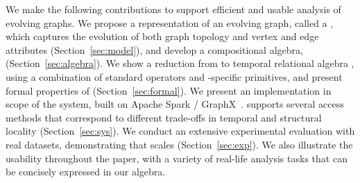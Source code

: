 We make the following contributions to support efficient and usable
analysis of evolving graphs.
%
%
 We propose a representation of an evolving graph, called a \tg, which
 captures the evolution of both graph topology and vertex and edge
 attributes (Section~\ref{sec:model}), and develop a compositional \tg
 algebra, \tga (Section~\ref{sec:algebra}).
%
We show a reduction from \tga to temporal relational algebra
  \tra, using a combination of standard operators and \tg-specific
  primitives, and present formal properties of \tga
  (Section~\ref{sec:formal}).
%
We present an implementation in scope of the \ql system, built
  on Apache Spark / GraphX~\cite{DBLP:conf/osdi/GonzalezXDCFS14}. \ql
  supports several access methods that correspond to different
  trade-offs in temporal and structural locality
  (Section~\ref{sec:sys}).
%
We conduct an extensive experimental evaluation with real
  datasets, demonstrating that \ql scales (Section~\ref{sec:exp}).  We
  also illustrate the usability throughout the paper, with a variety
  of real-life analysis tasks that can be concisely expressed in our
  algebra.



